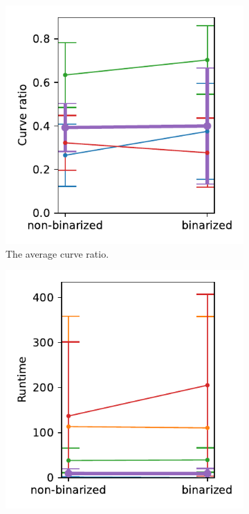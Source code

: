 \begin{figure}[h]
\begin{subfigure}{.3\textwidth}
    \includegraphics[width=\textwidth]{graphics/eval/curve ratio_True_1024-1.024_tonari.pdf}
    \caption{The average curve ratio.}
\end{subfigure}
    \begin{subfigure}{.3\textwidth}
    \centering
    \includegraphics[width=\textwidth]{graphics/eval/runtime_True_1024-1.024_tonari.pdf}

\end{subfigure}
\end{figure}
